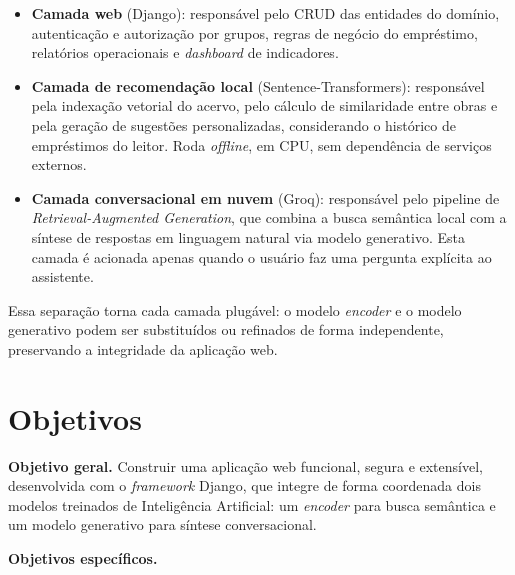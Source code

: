 \documentclass[monografia,abnt]{inf-ufg-modificado}
\begin{document}
\begin{itemize}
    \item \textbf{Camada web} (Django): responsável pelo CRUD das entidades do domínio, autenticação e autorização por grupos, regras de negócio do empréstimo, relatórios operacionais e \textit{dashboard} de indicadores.
    \item \textbf{Camada de recomendação local} (Sentence-Transformers): responsável pela indexação vetorial do acervo, pelo cálculo de similaridade entre obras e pela geração de sugestões personalizadas, considerando o histórico de empréstimos do leitor. Roda \textit{offline}, em CPU, sem dependência de serviços externos.
    \item \textbf{Camada conversacional em nuvem} (Groq): responsável pelo pipeline de \textit{Retrieval-Augmented Generation}, que combina a busca semântica local com a síntese de respostas em linguagem natural via modelo generativo. Esta camada é acionada apenas quando o usuário faz uma pergunta explícita ao assistente.
\end{itemize}

Essa separação torna cada camada plugável: o modelo \textit{encoder} e o modelo generativo podem ser substituídos ou refinados de forma independente, preservando a integridade da aplicação web.

\section{Objetivos}

\noindent\textbf{Objetivo geral.} Construir uma aplicação web funcional, segura e extensível, desenvolvida com o \textit{framework} Django, que integre de forma coordenada dois modelos treinados de Inteligência Artificial: um \textit{encoder} para busca semântica e um modelo generativo para síntese conversacional.

\noindent\textbf{Objetivos específicos.}
\end{document}
